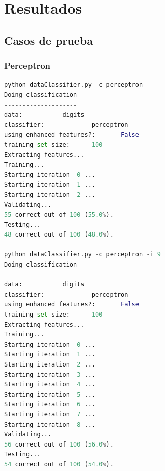 \documentclass{report}
\begin{document}
        \paragraph*{}{

        }
  \chapter{Resultados}
    \section{Casos de prueba}
      \subsection{Perceptron}
        \begin{lstlisting}[language=Python, caption=Ejecución del perceptron]
python dataClassifier.py -c perceptron
Doing classification
--------------------
data:           digits
classifier:             perceptron
using enhanced features?:       False
training set size:      100
Extracting features...
Training...
Starting iteration  0 ...
Starting iteration  1 ...
Starting iteration  2 ...
Validating...
55 correct out of 100 (55.0%).
Testing...
48 correct out of 100 (48.0%).

python dataClassifier.py -c perceptron -i 9  
Doing classification
--------------------
data:           digits
classifier:             perceptron
using enhanced features?:       False
training set size:      100
Extracting features...
Training...
Starting iteration  0 ...
Starting iteration  1 ...
Starting iteration  2 ...
Starting iteration  3 ...
Starting iteration  4 ...
Starting iteration  5 ...
Starting iteration  6 ...
Starting iteration  7 ...
Starting iteration  8 ...
Validating...
56 correct out of 100 (56.0%).
Testing...
54 correct out of 100 (54.0%).
        \end{lstlisting}
\end{document}
